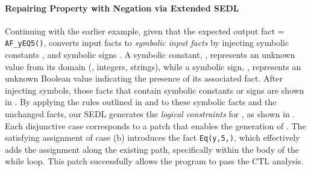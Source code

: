 \paragraph*{\textbf{Repairing Property with Negation via Extended SEDL}}
\label{sec:example:protocol}
Continuing with the earlier example, given that the expected output fact \code{\relation} {=} \lstinline|AF_yEQ5(|\lstinline|)|, \toolName converts input facts to \emph{symbolic input facts} by injecting symbolic constants , and symbolic signs . 
A symbolic constant, \code{\alpha}, represents an unknown value from its domain (\eg, integers, strings), while a symbolic sign, \code{\xi}, represents an unknown Boolean value indicating the presence of its associated fact. 
After injecting symbols, those facts that contain symbolic constants or signs are shown in .
By applying the rules outlined in  and  to these symbolic facts and the unchanged facts, our SEDL generates the \emph{logical constraints} \code{\psi} for \code{\relation}, as shown in . 
Each disjunctive case corresponds to a patch that enables the generation of \code{\relation}. 
The satisfying assignment of case (b) introduces the fact \lstinline|Eq(y,5,|\lstinline|)|, which effectively adds the assignment  along the existing path, specifically within the body of the while loop. This patch successfully allows the program to pass the CTL analysis. 



